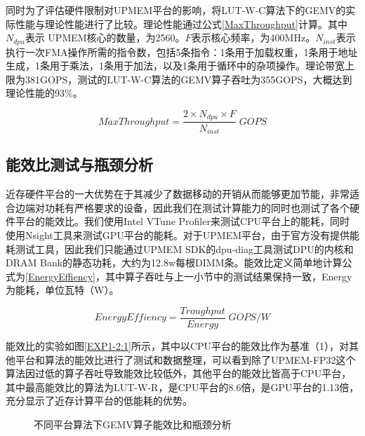 同时为了评估硬件限制对UPMEM平台的影响，将LUT-W-C算法下的GEMV的实际性能与理论性能进行了比较。理论性能通过公式\ref{MaxThroughput}计算。其中$N_{dpu}$表示 UPMEM核心的数量，为2560。$F$表示核心频率，为400MHz。$N_{inst}$表示执行一次FMA操作所需的指令数，包括5条指令：1条用于加载权重，1条用于地址生成，1条用于乘法，1条用于加法，以及1条用于循环中的杂项操作。理论带宽上限为381GOPS，测试的LUT-W-C算法的GEMV算子吞吐为355GOPS，大概达到理论性能的93\%。

\begin{equation}
    MaxThroughput=\frac{2\times N_{dpu}\times F}{N_{inst}}\; GOPS
    \label{MaxThroughput}
\end{equation}

\subsection{能效比测试与瓶颈分析}
近存硬件平台的一大优势在于其减少了数据移动的开销从而能够更加节能，非常适合边端对功耗有严格要求的设备，因此我们在测试计算能力的同时也测试了各个硬件平台的能效比。我们使用Intel VTune Profiler来测试CPU平台上的能耗，同时使用Nsight工具来测试GPU平台的能耗。对于UPMEM平台，由于官方没有提供能耗测试工具，因此我们只能通过UPMEM SDK的dpu-diag工具测试DPU的内核和DRAM Bank的静态功耗，大约为12.8w每根DIMM条。能效比定义简单地计算公式为\ref{EnergyEffiency}，其中算子吞吐与上一小节中的测试结果保持一致，Energy为能耗，单位瓦特（W）。

\begin{equation}
    EnergyEffiency=\frac{Troughput}{Energy}\; GOPS/W
    \label{EnergyEffiency}
\end{equation}

能效比的实验如图\ref{EXP1-2:1}所示，其中以CPU平台的能效比作为基准（1），对其他平台和算法的能效比进行了测试和数据整理，可以看到除了UPMEM-FP32这个算法因过低的算子吞吐导致能效比较低外，其他平台的能效比皆高于CPU平台，其中最高能效比的算法为LUT-W-R，是CPU平台的8.6倍，是GPU平台的1.13倍，充分显示了近存计算平台的低能耗的优势。

\begin{figure}[htbp!]
	\centering
	\label{EXP1-2}
	\caption{不同平台算法下GEMV算子能效比和瓶颈分析}
\end{figure}

